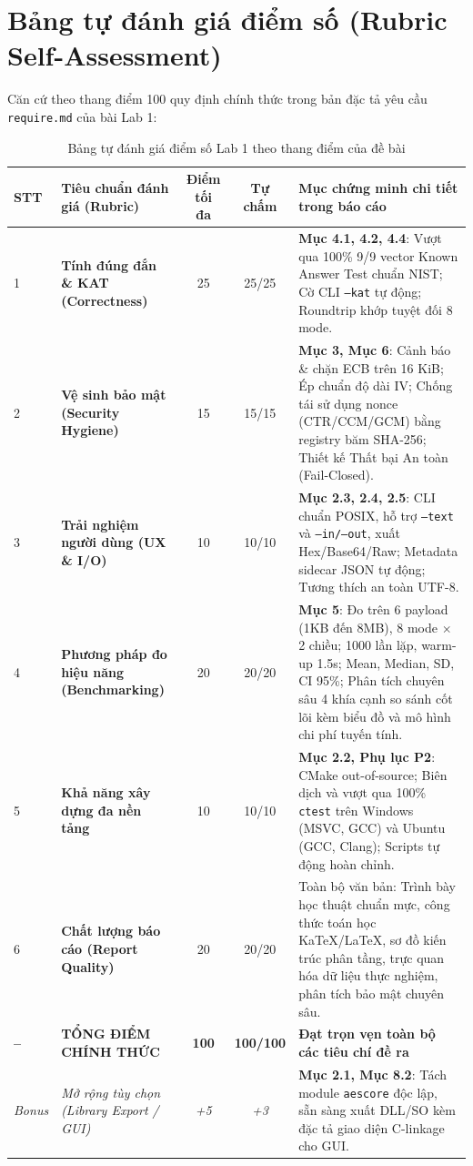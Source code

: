 \documentclass[12pt, a4paper]{report}
\begin{document}
\chapter*{Bảng tự đánh giá điểm số (Rubric Self-Assessment)}

Căn cứ theo thang điểm 100 quy định chính thức trong bản đặc tả yêu cầu \texttt{require.md} của bài Lab 1:

\begin{table}[H]
\centering
\small
\caption{Bảng tự đánh giá điểm số Lab 1 theo thang điểm của đề bài}
\label{tab:rubric}
\begin{tabular}{p{0.6cm} p{5.5cm} c c p{6.5cm}}
\toprule
\textbf{STT} & \textbf{Tiêu chuẩn đánh giá (Rubric)} & \textbf{Điểm tối đa} & \textbf{Tự chấm} & \textbf{Mục chứng minh chi tiết trong báo cáo} \\
\midrule
1 & \textbf{Tính đúng đắn \& KAT (Correctness)} & 25 & 25/25 & \textbf{Mục 4.1, 4.2, 4.4}: Vượt qua 100\% 9/9 vector Known Answer Test chuẩn NIST; Cờ CLI \texttt{--kat} tự động; Roundtrip khớp tuyệt đối 8 mode. \\
\midrule
2 & \textbf{Vệ sinh bảo mật (Security Hygiene)} & 15 & 15/15 & \textbf{Mục 3, Mục 6}: Cảnh báo \& chặn ECB trên 16 KiB; Ép chuẩn độ dài IV; Chống tái sử dụng nonce (CTR/CCM/GCM) bằng registry băm SHA-256; Thiết kế Thất bại An toàn (Fail-Closed). \\
\midrule
3 & \textbf{Trải nghiệm người dùng (UX \& I/O)} & 10 & 10/10 & \textbf{Mục 2.3, 2.4, 2.5}: CLI chuẩn POSIX, hỗ trợ \texttt{--text} và \texttt{--in/--out}, xuất Hex/Base64/Raw; Metadata sidecar JSON tự động; Tương thích an toàn UTF-8. \\
\midrule
4 & \textbf{Phương pháp đo hiệu năng (Benchmarking)} & 20 & 20/20 & \textbf{Mục 5}: Đo trên 6 payload (1KB đến 8MB), 8 mode $\times$ 2 chiều; 1000 lần lặp, warm-up 1.5s; Mean, Median, SD, CI 95\%; Phân tích chuyên sâu 4 khía cạnh so sánh cốt lõi kèm biểu đồ và mô hình chi phí tuyến tính. \\
\midrule
5 & \textbf{Khả năng xây dựng đa nền tảng} & 10 & 10/10 & \textbf{Mục 2.2, Phụ lục P2}: CMake out-of-source; Biên dịch và vượt qua 100\% \texttt{ctest} trên Windows (MSVC, GCC) và Ubuntu (GCC, Clang); Scripts tự động hoàn chỉnh. \\
\midrule
6 & \textbf{Chất lượng báo cáo (Report Quality)} & 20 & 20/20 & Toàn bộ văn bản: Trình bày học thuật chuẩn mực, công thức toán học KaTeX/LaTeX, sơ đồ kiến trúc phân tầng, trực quan hóa dữ liệu thực nghiệm, phân tích bảo mật chuyên sâu. \\
\midrule
\textbf{--} & \textbf{TỔNG ĐIỂM CHÍNH THỨC} & \textbf{100} & \textbf{100/100} & \textbf{Đạt trọn vẹn toàn bộ các tiêu chí đề ra} \\
\midrule
\textit{Bonus} & \textit{Mở rộng tùy chọn (Library Export / GUI)} & \textit{+5} & \textit{+3} & \textbf{Mục 2.1, Mục 8.2}: Tách module \texttt{aescore} độc lập, sẵn sàng xuất DLL/SO kèm đặc tả giao diện C-linkage cho GUI. \\
\bottomrule
\end{tabular}
\end{table}
\clearpage
\end{document}
